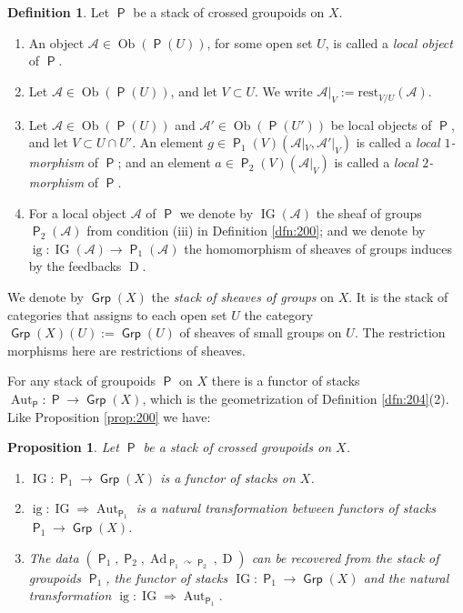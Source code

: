 \documentclass[a4paper, 10pt]{amsart}
\newtheorem{prop}[equation]{Proposition}
\theoremstyle{definition}
\newtheorem{dfn}[equation]{Definition}
\numberwithin{equation}{section}
\newcommand{\opn}{\operatorname}
\newcommand{\cat}[1]{\operatorname{\mathsf{#1}}}
\newcommand{\mcal}[1]{\mathcal{#1}}
\newcommand{\mrm}[1]{\mathrm{#1}}
\newcommand{\bsym}[1]{\boldsymbol{#1}}
\newcommand{\twoto}{\Rightarrow}
\newcommand{\twocat}[1]{\operatorname{\bsym{\cat{#1}}}}
\newcommand{\crvar}{\curvearrowright}
\begin{document}
\begin{dfn} \label{dfn:203}
Let $\twocat{P}$ be a stack of crossed groupoids on $X$.
\begin{enumerate}
\item An object $\mcal{A} \in \opn{Ob}(\twocat{P}(U))$, for some open set $U$,
is
called a {\em local object} of $\twocat{P}$.

\item Let $\mcal{A} \in \opn{Ob}(\twocat{P}(U))$,  and let $V \subset U$. 
We write $\mcal{A}|_V := \mrm{rest}^{}_{V / U} (\mcal{A})$.

\item Let $\mcal{A} \in \opn{Ob}(\twocat{P}(U))$ and
$\mcal{A}' \in \opn{Ob}(\twocat{P}(U'))$ 
be local objects of $\twocat{P}$, and let $V \subset U \cap U'$.
An element $g \in \twocat{P}_1(V)(\mcal{A}|_V, \mcal{A}'|_V)$
is called a {\em local $1$-morphism} of $\twocat{P}$; and 
an element $a \in \twocat{P}_2(V)(\mcal{A}|_V)$
is called a {\em local $2$-morphism} of $\twocat{P}$.

\item For a local object $\mcal{A}$ of $\twocat{P}$ we denote by
$\opn{IG}(\mcal{A})$ the sheaf of groups $\twocat{P}_2(\mcal{A})$
from condition (iii) in Definition \ref{dfn:200};
and we denote by 
$\opn{ig} : \opn{IG}(\mcal{A}) \to \twocat{P}_1(\mcal{A})$ 
the homomorphism of sheaves of groups induces by the feedbacks $\opn{D}$. 
\end{enumerate}
\end{dfn}

We denote by $\twocat{Grp}(X)$ the {\em stack of sheaves of groups} on $X$. 
It is the stack of categories that assigns
to each open set $U$ the category 
$\twocat{Grp}(X)(U) := \cat{Grp}(U)$
of sheaves of small groups on $U$. The restriction morphisms here are
restrictions of sheaves.

For any stack of groupoids $\twocat{P}$ on $X$ there is a functor of stacks 
$\opn{Aut}_{\twocat{P}} : \twocat{P} \to \twocat{Grp}(X)$,
which is the geometrization of Definition \ref{dfn:204}(2). 
Like Proposition \ref{prop:200} we have:

\begin{prop} \label{prop:201}
Let $\twocat{P}$ be a stack of crossed groupoids on $X$.
\begin{enumerate}
\item $\opn{IG} : \twocat{P}_1 \to \twocat{Grp}(X)$ is a functor of stacks 
on $X$.

\item $\opn{ig} : \opn{IG} \twoto \opn{Aut}_{\twocat{P}_1}$
is a natural transformation between functors of stacks
$\twocat{P}_1 \to \twocat{Grp}(X)$.

\item The data 
$( \twocat{P}_1, \twocat{P}_2, \opn{Ad}_{\twocat{P}_1 \crvar \twocat{P}_{2}},
\opn{D} )$
can be recovered from the stack of groupoids $\twocat{P}_1$, the functor of
stacks 
$\opn{IG} : \twocat{P}_1 \to \twocat{Grp}(X)$ and the natural transformation 
$\opn{ig} : \opn{IG} \twoto \opn{Aut}_{\twocat{P}_1}$.
\end{enumerate}
\end{prop}
\end{document}
